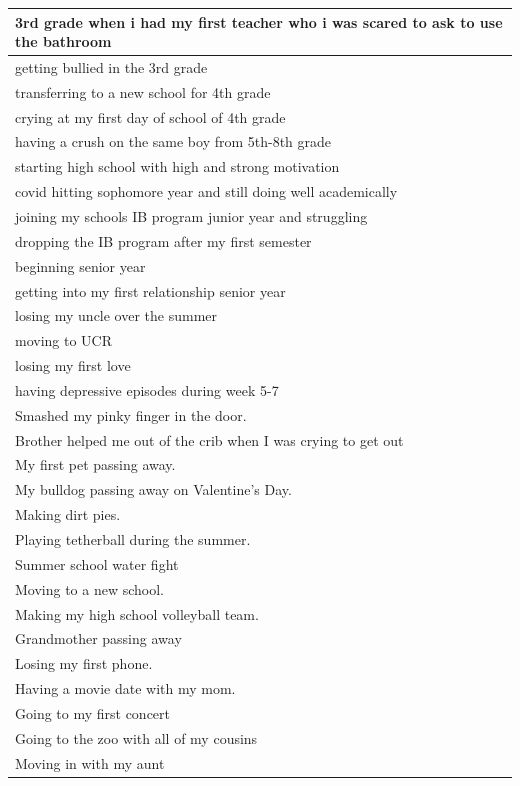 \documentclass[
  .7em,
  letterpaper,
  DIV=11,
  numbers=noendperiod]{scrartcl}
\begin{document}
\begin{table}
\begin{tabular}{l}
\hline
3rd grade when i had my first teacher who i was scared to ask to use the bathroom\\
\hline
getting bullied in the 3rd grade\\
\hline
transferring to a new school for 4th grade\\
\hline
crying at my first day of school of 4th grade\\
\hline
having a crush on the same boy from 5th-8th grade\\
\hline
starting high school with high and strong motivation\\
\hline
covid hitting sophomore year and still doing well academically\\
\hline
joining my schools IB program junior year and struggling\\
\hline
dropping the IB program after my first semester\\
\hline
beginning senior year\\
\hline
getting into my first relationship senior year\\
\hline
losing my uncle over the summer\\
\hline
moving to UCR\\
\hline
losing my first love\\
\hline
having depressive episodes during week 5-7\\
\hline
Smashed my pinky finger in the door.\\
\hline
Brother helped me out of the crib when I was crying to get out\\
\hline
My first pet passing away.\\
\hline
My bulldog passing away on Valentine’s Day.\\
\hline
Making dirt pies.\\
\hline
Playing tetherball during the summer.\\
\hline
Summer school water fight\\
\hline
Moving to a new school.\\
\hline
Making my high school volleyball team.\\
\hline
Grandmother passing away\\
\hline
Losing my first phone.\\
\hline
Having a movie date with my mom.\\
\hline
Going to my first concert\\
\hline
Going to the zoo with all of my cousins\\
\hline
Moving in with my aunt\\

\end{tabular}
\end{table}
\end{document}
